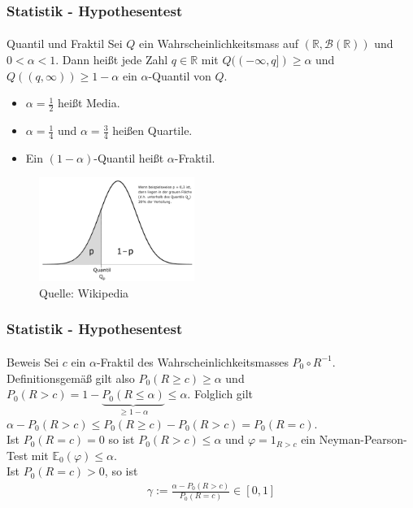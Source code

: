 \documentclass{beamer}
\begin{document}
\begin{frame}
    \frametitle{Statistik - Hypothesentest}
\framesubtitle{}
\begin{block}{Quantil und Fraktil}
Sei $Q$ ein Wahrscheinlichkeitsmass auf $(\mathbb{R}, \mathcal{B}(\mathbb{R}) )$ und $0 < \alpha <1$. Dann heißt jede Zahl $q \in \mathbb{R}$ mit $Q((-\infty, q ]) \geq \alpha$ und  $Q((q, \infty )) \geq 1- \alpha$  ein $\alpha$-Quantil von $Q$.
\begin {itemize}
\item $\alpha = \frac{1}{2}$ heißt Media.
\item $\alpha = \frac{1}{4}$ und  $\alpha = \frac{3}{4}$ heißen Quartile.
\item Ein $(1-\alpha)$-Quantil heißt $\alpha$-Fraktil. 
\end{itemize}
\end{block}

\begin{figure}[htp]
      \centering
    \includegraphics[width=0.45\textwidth]{img/Quantil}
      \caption{Quelle: Wikipedia}
\end{figure}

 \end{frame}


\begin{frame}
    \frametitle{Statistik - Hypothesentest}
\framesubtitle{}
\begin{block}{Beweis}
Sei $c$ ein $\alpha$-Fraktil des Wahrscheinlichkeitsmasses $P_0 \circ R^{-1}$. Definitionsgemäß gilt also $P_0(R \geq c) \geq \alpha$ und $P_0 (R > c) = 1 - \underbrace{P_0(R \leq \alpha)}_{\geq 1 - \alpha} \leq \alpha$. Folglich gilt
$\alpha - P_0(R >c) \leq P_0(R \geq c) - P_0(R > c) = P_0(R = c) $. \\
Ist $ P_0(R = c)  = 0$ so ist $ P_0(R >c) \leq \alpha$ und $\varphi = 1_{R > c}$ ein Neyman-Pearson-Test mit $\mathbb{E}_0(\varphi) \leq\alpha$. 
\\ Ist $ P_0(R = c) > 0$, so ist
\begin{align*}
\gamma := \frac{\alpha - P_0(R > c)}{ P_0(R=c)} \in [0,1]
\end{align*}
\end{block}

 \end{frame}
\end{document}
